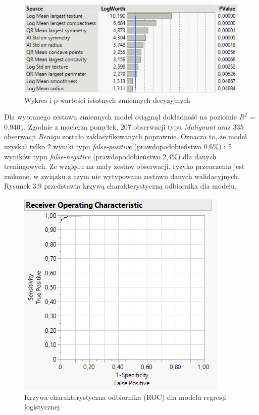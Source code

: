 \begin{figure}[!ht]
	\centering
	\includegraphics[width=0.9\linewidth]{Rozdzial3/pvalue2}
	\caption{Wykres i p-wartości istotnych zmiennych decyzyjnych}
	\label{fig:pvalue2}
\end{figure}

Dla wybranego zestawu zmiennych model osiągnął dokładność na poziomie $R^{2}$ = 0.9401. Zgodnie z macierzą pomyłek, 207 obserwacji typu \textit{Malignant} oraz 335 obserwacji \textit{Benign} zostało zaklasyfikowanych poprawnie. Oznacza to, że model uzyskał tylko 2 wyniki typu \textit{false-positive} (prawdopodobieństwo 0,6\%) i 5 wyników typu \textit{false-negative} (prawdopodobieństwo 2,4\%) dla danych treningowych. Ze względu na mały zestaw obserwacji, ryzyko przeuczenia jest znikome, w związku z czym nie wytypowano zestawu danych walidacyjnych. Rysunek 3.9 przedstawia krzywą charakterystyczną odbiornika dla modelu. 

\begin{figure}[!ht]
	\centering
	\includegraphics[width=0.6\linewidth]{Rozdzial3/roc}
	\caption{Krzywa charakterystyczna odbiornika (ROC) dla modelu regresji logistycznej}
	\label{fig:roc}
\end{figure}



